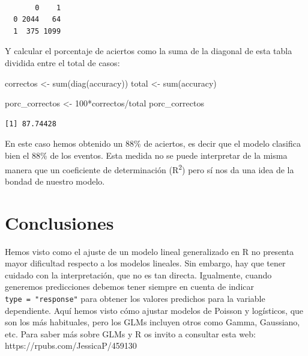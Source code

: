 \documentclass[
  letterpaper,
  DIV=11,
  numbers=noendperiod]{scrreprt}
\newenvironment{Shaded}{\begin{snugshade}}{\end{snugshade}}
\newcommand{\DecValTok}[1]{\textcolor[rgb]{0.68,0.00,0.00}{#1}}
\newcommand{\FunctionTok}[1]{\textcolor[rgb]{0.28,0.35,0.67}{#1}}
\newcommand{\NormalTok}[1]{\textcolor[rgb]{0.00,0.23,0.31}{#1}}
\newcommand{\OtherTok}[1]{\textcolor[rgb]{0.00,0.23,0.31}{#1}}
\newcommand{\SpecialCharTok}[1]{\textcolor[rgb]{0.37,0.37,0.37}{#1}}
\begin{document}
\begin{Shaded}
\end{Shaded}

\begin{verbatim}
   
       0    1
  0 2044   64
  1  375 1099
\end{verbatim}

Y calcular el porcentaje de aciertos como la suma de la diagonal de esta
tabla dividida entre el total de casos:

\begin{Shaded}
\begin{Highlighting}[]
\NormalTok{correctos }\OtherTok{\textless{}{-}} \FunctionTok{sum}\NormalTok{(}\FunctionTok{diag}\NormalTok{(accuracy))}
\NormalTok{total }\OtherTok{\textless{}{-}} \FunctionTok{sum}\NormalTok{(accuracy)}

\NormalTok{porc\_correctos }\OtherTok{\textless{}{-}} \DecValTok{100}\SpecialCharTok{*}\NormalTok{correctos}\SpecialCharTok{/}\NormalTok{total}
\NormalTok{porc\_correctos}
\end{Highlighting}
\end{Shaded}

\begin{verbatim}
[1] 87.74428
\end{verbatim}

En este caso hemos obtenido un 88\% de aciertos, es decir que el modelo
clasifica bien el 88\% de los eventos. Esta medida no se puede
interpretar de la misma manera que un coeficiente de determinación
(R\textsuperscript{2}) pero sí nos da una idea de la bondad de nuestro
modelo.

\hypertarget{conclusiones}{%
\section{Conclusiones}\label{conclusiones}}

Hemos visto como el ajuste de un modelo lineal generalizado en R no
presenta mayor dificultad respecto a los modelos lineales. Sin embargo,
hay que tener cuidado con la interpretación, que no es tan directa.
Igualmente, cuando generemos predicciones debemos tener siempre en
cuenta de indicar \texttt{type\ =\ "response"} para obtener los valores
predichos para la variable dependiente. Aquí hemos visto cómo ajustar
modelos de Poisson y logísticos, que son los más habituales, pero los
GLMs incluyen otros como Gamma, Gaussiano, etc. Para saber más sobre
GLMs y R os invito a consultar esta web:
https://rpubs.com/JessicaP/459130
\end{document}
